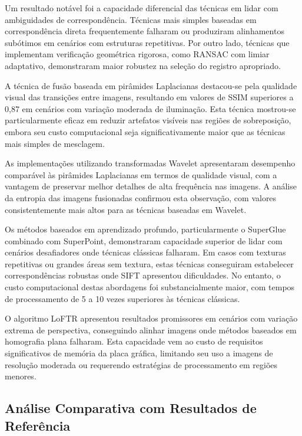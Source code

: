 Um resultado notável foi a capacidade diferencial das técnicas em lidar com ambiguidades de correspondência. Técnicas mais simples baseadas em correspondência direta frequentemente falharam ou produziram alinhamentos subótimos em cenários com estruturas repetitivas. Por outro lado, técnicas que implementam verificação geométrica rigorosa, como RANSAC com limiar adaptativo, demonstraram maior robustez na seleção do registro apropriado.

A técnica de fusão baseada em pirâmides Laplacianas destacou-se pela qualidade visual das transições entre imagens, resultando em valores de SSIM superiores a 0,87 em cenários com variação moderada de iluminação. Esta técnica mostrou-se particularmente eficaz em reduzir artefatos visíveis nas regiões de sobreposição, embora seu custo computacional seja significativamente maior que as técnicas mais simples de mesclagem.

As implementações utilizando transformadas Wavelet apresentaram desempenho comparável às pirâmides Laplacianas em termos de qualidade visual, com a vantagem de preservar melhor detalhes de alta frequência nas imagens. A análise da entropia das imagens fusionadas confirmou esta observação, com valores consistentemente mais altos para as técnicas baseadas em Wavelet.

Os métodos baseados em aprendizado profundo, particularmente o SuperGlue combinado com SuperPoint, demonstraram capacidade superior de lidar com cenários desafiadores onde técnicas clássicas falharam. Em casos com texturas repetitivas ou grandes áreas sem textura, estas técnicas conseguiram estabelecer correspondências robustas onde SIFT apresentou dificuldades. No entanto, o custo computacional destas abordagens foi substancialmente maior, com tempos de processamento de 5 a 10 vezes superiores às técnicas clássicas.

O algoritmo LoFTR apresentou resultados promissores em cenários com variação extrema de perspectiva, conseguindo alinhar imagens onde métodos baseados em homografia plana falharam. Esta capacidade vem ao custo de requisitos significativos de memória da placa gráfica, limitando seu uso a imagens de resolução moderada ou requerendo estratégias de processamento em regiões menores.

\subsection{Análise Comparativa com Resultados de Referência}

